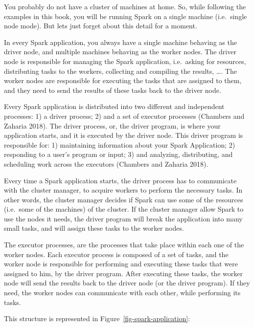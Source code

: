 \documentclass[
  11pt,
  letterpaper,
  DIV=11,
  numbers=noendperiod]{scrreprt}
\begin{document}
You probably do not have a cluster of machines at home. So, while
following the examples in this book, you will be running Spark on a
single machine (i.e.~single node mode). But lets just forget about this
detail for a moment.

In every Spark application, you always have a single machine behaving as
the driver node, and multiple machines behaving as the worker nodes. The
driver node is responsible for managing the Spark application,
i.e.~asking for resources, distributing tasks to the workers, collecting
and compiling the results, \ldots. The worker nodes are responsible for
executing the tasks that are assigned to them, and they need to send the
results of these tasks back to the driver node.

Every Spark application is distributed into two different and
independent processes: 1) a driver process; 2) and a set of executor
processes (Chambers and Zaharia 2018). The driver process, or, the
driver program, is where your application starts, and it is executed by
the driver node. This driver program is responsible for: 1) maintaining
information about your Spark Application; 2) responding to a user's
program or input; 3) and analyzing, distributing, and scheduling work
across the executors (Chambers and Zaharia 2018).

Every time a Spark application starts, the driver process has to
communicate with the cluster manager, to acquire workers to perform the
necessary tasks. In other words, the cluster manager decides if Spark
can use some of the resources (i.e.~some of the machines) of the
cluster. If the cluster manager allow Spark to use the nodes it needs,
the driver program will break the application into many small tasks, and
will assign these tasks to the worker nodes.

The executor processes, are the processes that take place within each
one of the worker nodes. Each executor process is composed of a set of
tasks, and the worker node is responsible for performing and executing
these tasks that were assigned to him, by the driver program. After
executing these tasks, the worker node will send the results back to the
driver node (or the driver program). If they need, the worker nodes can
communicate with each other, while performing its tasks.

This structure is represented in Figure~\ref{fig-spark-application}:
\end{document}
